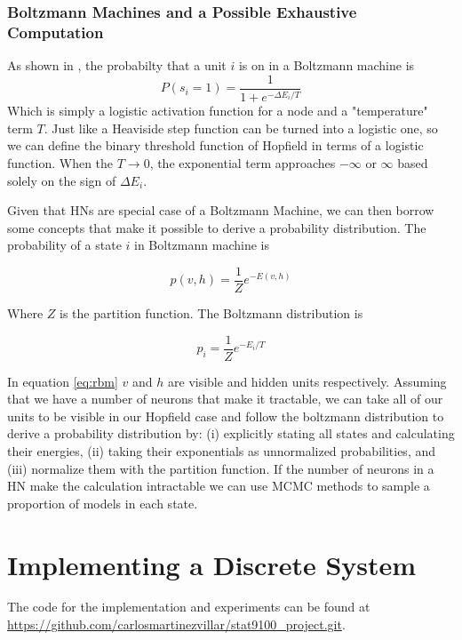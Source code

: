 \documentclass[11pt]{article}
\begin{document}
	\subsubsection{Boltzmann Machines and a Possible Exhaustive Computation}\label{boltzmann}
	As shown in \cite{hinton2012practical}, the probabilty that a unit $i$ is on in a Boltzmann machine is 
	\begin{equation}\label{eq:hopfieldtemperature}
		P(s_i=1) = \frac{1}{1 + e^{-\Delta E_i / T} }
	\end{equation}
	Which is simply a logistic activation function for a node and a "temperature" term $T$. 
	Just like a Heaviside step function can be turned into a logistic one, so we can define the binary threshold function of Hopfield in terms of a logistic function. 
	When the $T \rightarrow 0 $, the exponential term approaches $-\infty$ or $\infty$ based solely on the sign of $\Delta E_i$.
	
	Given that HNs are special case of a Boltzmann Machine, we can then borrow some concepts that make it possible to derive a probability distribution. The probability of a state $i$ in Boltzmann machine is
	
	\begin{equation}\label{eq:rbm}
		p(v,h) = \frac{1}{Z} e^{-E(v,h)}
	\end{equation}
	
	 Where $Z$ is the partition function. The Boltzmann distribution is
	
	\begin{equation}
		p_i = \frac{1}{Z} e^{-E_i/T}
	\end{equation}
	 
	In equation \ref{eq:rbm} $v$ and $h$ are visible and hidden units respectively. 
	Assuming that we have a number of neurons that make it tractable, we can take all of our units to be visible in our Hopfield case and follow the boltzmann distribution to derive a probability distribution by:
	(i) explicitly stating all states and calculating their energies, (ii) taking their exponentials as unnormalized probabilities, and (iii) normalize them with the partition function. 
	If the number of neurons in a HN make the calculation intractable we can use MCMC methods to sample a proportion of models in each state.
	
	
	\section{Implementing a Discrete System}\label{experiments}
	The code for the implementation and experiments can be found at \url{https://github.com/carlosmartinezvillar/stat9100_project.git}.
	
\end{document}
